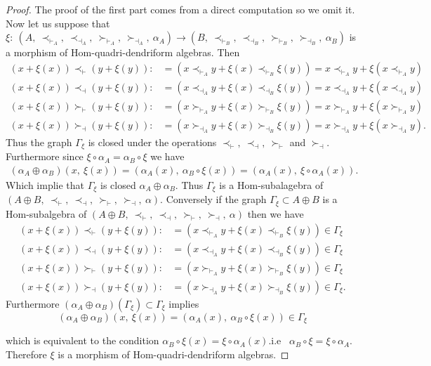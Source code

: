 \documentclass[11pt,twoside,reqno]{amsart}
\theoremstyle{plain}
\theoremstyle{definition}
\begin{document}
\begin{proof}
The proof of the first part comes from a direct computation  so we omit it. Now  let us suppose that 
$\xi :\  (A , \ \prec_{\vdash_{A}} ,\ \prec_{\dashv_{A}},\   \succ_{\vdash_{A}} ,\ \succ_{\dashv_{A}},\  \alpha_{A})\longrightarrow(B ,\ \prec_{\vdash_{B}} ,\ \prec_{\dashv_{B}} ,\ \succ_{\vdash_{B}},\  \succ_{\dashv_{B}} ,\ \alpha_{B})$ is a morphism of Hom-quadri-dendriform algebras. Then 
\begin{align*}
 (x+\xi(x))\prec_\vdash(y+\xi(y)):&=(x\prec_{\vdash_{A}}y+\xi(x)\prec_{\vdash_{B}}\xi(y))=x\prec_{\vdash_{A}} y+\xi(x\prec_{\vdash_{A}} y) \\
 (x+\xi(x))\prec_\dashv(y+\xi(y)):&=(x\prec_{\dashv_{A}}y+\xi(x)\prec_{\dashv_{B}}\xi(y))=x\prec_{\dashv_{A}} y+\xi(x\prec_{\dashv_{A}} y) \\
 (x+\xi(x))\succ_\vdash(y+\xi(y)):&=(x\succ_{\vdash_{A}}y+\xi(x)\succ_{\vdash_{B}}\xi(y))=x\succ_{\vdash_{A}} y+\xi(x\succ_{\vdash_{A}} y) \\
 (x+\xi(x))\succ_\dashv(y+\xi(y)):&=(x\succ_{\dashv_{A}}y+\xi(x)\succ_{\dashv_{B}}\xi(y))=x\succ_{\dashv_{A}} y+\xi(x\succ_{\dashv_{A}} y).
\end{align*}
Thus the graph $\Gamma_{\xi}$ is closed under the operations $\prec_\vdash,\  \prec_\dashv,\  \succ_\vdash$ and $\succ_\dashv.$\\
Furthermore since $\xi\circ\alpha_A=\alpha_B\circ\xi $ we have 
\begin{align*}
 (\alpha_A\oplus\alpha_B)(x ,\ \xi(x))=(\alpha_A(x),\ \alpha_B\circ\xi(x))=(\alpha_A(x),\
  \xi\circ\alpha_A(x)).
\end{align*}
Which implie that $\Gamma_\xi$ is closed $\alpha_A\oplus\alpha_B.$ Thus  $\Gamma_\xi$ is a Hom-subalagebra of $(A\oplus B ,\ \prec_\vdash ,\ \prec_\dashv,\  \succ_\vdash ,\ \succ_\dashv ,\ \alpha).$ 
Conversely  if the graph $\Gamma_\xi\subset A\oplus B$ is a Hom-subalgebra of $(A\oplus B ,\ \prec_\vdash ,\ \prec_\dashv,\  \succ_\vdash,\  \succ_\dashv,\  \alpha)$ then we have
\begin{align*}
 (x+\xi(x))\prec_\vdash(y+\xi(y)):&=(x\prec_{\vdash_{A}}y+\xi(x)\prec_{\vdash_{B}}\xi(y))\in\Gamma_\xi \\
 (x+\xi(x))\prec_\dashv(y+\xi(y)):&=(x\prec_{\dashv_{A}}y+\xi(x)\prec_{\dashv_{B}}\xi(y))\in\Gamma_\xi \\
 (x+\xi(x))\succ_\vdash(y+\xi(y)):&=(x\succ_{\vdash_{A}}y+\xi(x)\succ_{\vdash_{B}}\xi(y))\in\Gamma_\xi \\
 (x+\xi(x))\succ_\dashv(y+\xi(y)):&=(x\succ_{\dashv_{A}}y+\xi(x)\succ_{\dashv_{B}}\xi(y))\in\Gamma_\xi.
\end{align*}
Furthermore  $(\alpha_A\oplus\alpha_B)(\Gamma_\xi)\subset\Gamma_\xi $ implies $$ (\alpha_A\oplus\alpha_B)(x,\ \xi(x))=(\alpha_A(x) ,\ \alpha_B\circ\xi(x))\in\Gamma_\xi$$

which is equivalent to the condition $\alpha_B\circ\xi(x)=\xi\circ\alpha_A(x) $.i.e \ $\alpha_B\circ\xi=\xi\circ\alpha_A.$ Therefore  $\xi$ is a morphism of Hom-quadri-dendriform algebras.
\end{proof}
\end{document}
